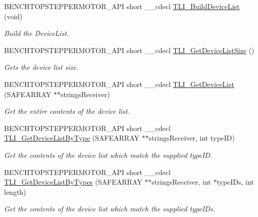 \begin{DoxyCompactItemize}
\item 
B\+E\+N\+C\+H\+T\+O\+P\+S\+T\+E\+P\+P\+E\+R\+M\+O\+T\+O\+R\+\_\+\+A\+PI short \+\_\+\+\_\+cdecl \hyperlink{group___benchtop_stepper_ga186c271da4110b8976b831183df3617c}{T\+L\+I\+\_\+\+Build\+Device\+List} (void)
\begin{DoxyCompactList}\small\item\em Build the Device\+List. \end{DoxyCompactList}\item 
B\+E\+N\+C\+H\+T\+O\+P\+S\+T\+E\+P\+P\+E\+R\+M\+O\+T\+O\+R\+\_\+\+A\+PI short \+\_\+\+\_\+cdecl \hyperlink{group___benchtop_stepper_ga83dd350a83896e95885970095c7c4f70}{T\+L\+I\+\_\+\+Get\+Device\+List\+Size} ()
\begin{DoxyCompactList}\small\item\em Gets the device list size. \end{DoxyCompactList}\item 
B\+E\+N\+C\+H\+T\+O\+P\+S\+T\+E\+P\+P\+E\+R\+M\+O\+T\+O\+R\+\_\+\+A\+PI short \+\_\+\+\_\+cdecl \hyperlink{group___benchtop_stepper_ga41cc6b514bf1c2b5797f5e3199ed29ee}{T\+L\+I\+\_\+\+Get\+Device\+List} (S\+A\+F\+E\+A\+R\+R\+AY $\ast$$\ast$strings\+Receiver)
\begin{DoxyCompactList}\small\item\em Get the entire contents of the device list. \end{DoxyCompactList}\item 
B\+E\+N\+C\+H\+T\+O\+P\+S\+T\+E\+P\+P\+E\+R\+M\+O\+T\+O\+R\+\_\+\+A\+PI short \+\_\+\+\_\+cdecl \hyperlink{group___benchtop_stepper_ga3d3ba2cbeb547a8057b4a700edb04414}{T\+L\+I\+\_\+\+Get\+Device\+List\+By\+Type} (S\+A\+F\+E\+A\+R\+R\+AY $\ast$$\ast$strings\+Receiver, int type\+ID)
\begin{DoxyCompactList}\small\item\em Get the contents of the device list which match the supplied type\+ID. \end{DoxyCompactList}\item 
B\+E\+N\+C\+H\+T\+O\+P\+S\+T\+E\+P\+P\+E\+R\+M\+O\+T\+O\+R\+\_\+\+A\+PI short \+\_\+\+\_\+cdecl \hyperlink{group___benchtop_stepper_gac4cb44a988babfd8caca47b7b0c20e8b}{T\+L\+I\+\_\+\+Get\+Device\+List\+By\+Types} (S\+A\+F\+E\+A\+R\+R\+AY $\ast$$\ast$strings\+Receiver, int $\ast$type\+I\+Ds, int length)
\begin{DoxyCompactList}\small\item\em Get the contents of the device list which match the supplied type\+I\+Ds. \end{DoxyCompactList}\item 
$$
\end{DoxyCompactItemize}
